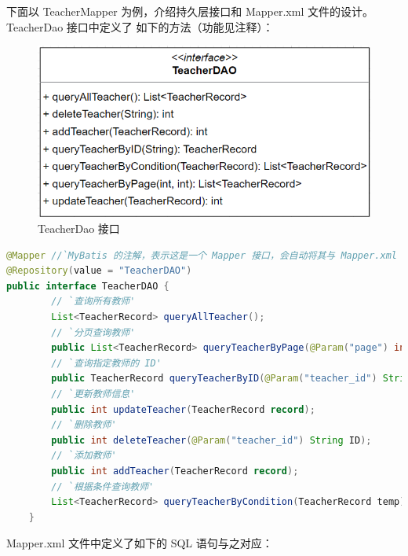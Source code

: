 \documentclass[12pt, a4paper]{article}
\begin{document}
下面以 TeacherMapper 为例，介绍持久层接口和 Mapper.xml 文件的设计。TeacherDao 接口中定义了
如下的方法（功能见注释）：
\begin{figure}[H]
  \centering
  \includegraphics[width = 0.6 \textwidth]{TeacherDao.png}
  \caption{TeacherDao 接口}
\end{figure}
\begin{lstlisting}[language = Java]
@Mapper //`MyBatis 的注解，表示这是一个 Mapper 接口，会自动将其与 Mapper.xml 文件关联'
@Repository(value = "TeacherDAO")
public interface TeacherDAO {
		// `查询所有教师'
		List<TeacherRecord> queryAllTeacher();
		// `分页查询教师'
		public List<TeacherRecord> queryTeacherByPage(@Param("page") int page, @Param("size") int size);
		// `查询指定教师的 ID'
		public TeacherRecord queryTeacherByID(@Param("teacher_id") String ID);
		// `更新教师信息'
		public int updateTeacher(TeacherRecord record);
		// `删除教师'
		public int deleteTeacher(@Param("teacher_id") String ID);
		// `添加教师'
		public int addTeacher(TeacherRecord record);
		// `根据条件查询教师'
		List<TeacherRecord> queryTeacherByCondition(TeacherRecord temp);
	}
\end{lstlisting}
Mapper.xml 文件中定义了如下的 SQL 语句与之对应：
\end{document}
